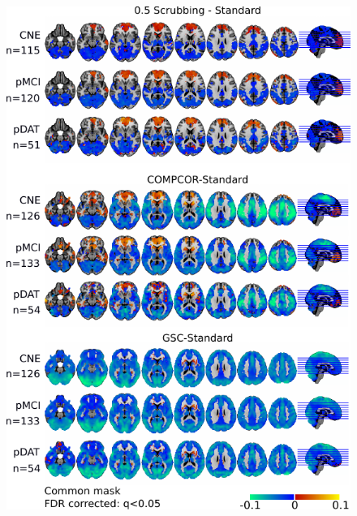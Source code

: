 \documentclass[authoryear]{elsarticle}
\begin{document}
\begin{figure}[tbp]
\begin{center}
\includegraphics[width=\linewidth]{../figures/scrubbing_impact_cne_mci_dat_all.pdf}
\end{center}
\caption{
}
\end{figure}
\end{document}
